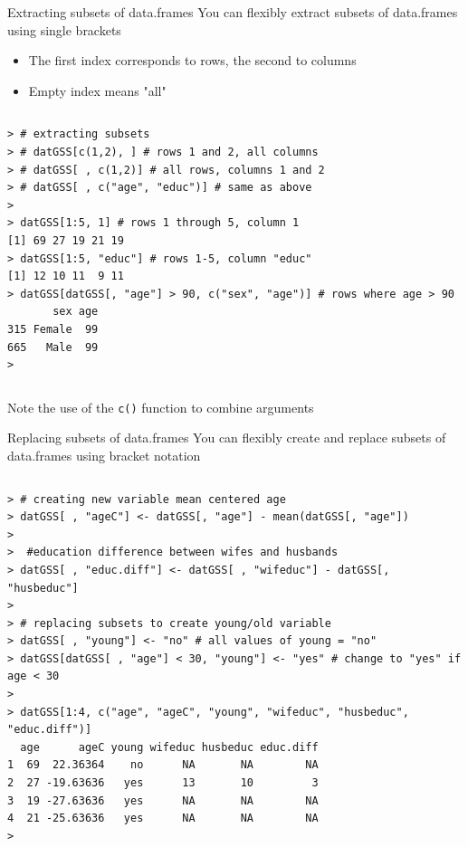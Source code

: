 \documentclass[table,smaller]{beamer}
\begin{document}
\begin{frame}[fragile,label=sec-5-4]{Extracting subsets of data.frames}
 You can flexibly extract subsets of data.frames using single brackets
\begin{itemize}
\item The first index corresponds to rows, the second to columns
\item Empty index means "all"
\end{itemize}

\vspace{-.5em}
\begin{columns}
\begin{block}{}
\begin{verbatim}
> # extracting subsets
> # datGSS[c(1,2), ] # rows 1 and 2, all columns
> # datGSS[ , c(1,2)] # all rows, columns 1 and 2
> # datGSS[ , c("age", "educ")] # same as above
> 
> datGSS[1:5, 1] # rows 1 through 5, column 1
[1] 69 27 19 21 19
> datGSS[1:5, "educ"] # rows 1-5, column "educ"
[1] 12 10 11  9 11
> datGSS[datGSS[, "age"] > 90, c("sex", "age")] # rows where age > 90
       sex age
315 Female  99
665   Male  99
>
\end{verbatim}
\end{block}
\end{columns}
\vspace{.5em}

Note the use of the \verb~c()~ function to combine arguments
\end{frame}
\begin{frame}[fragile,label=sec-5-5]{Replacing subsets of data.frames}
 You can flexibly create and replace subsets of data.frames using bracket notation

\vspace{-.5em}
\begin{columns}
\begin{block}{}
\begin{verbatim}
> # creating new variable mean centered age
> datGSS[ , "ageC"] <- datGSS[, "age"] - mean(datGSS[, "age"])
> 
>  #education difference between wifes and husbands
> datGSS[ , "educ.diff"] <- datGSS[ , "wifeduc"] - datGSS[, "husbeduc"]
> 
> # replacing subsets to create young/old variable
> datGSS[ , "young"] <- "no" # all values of young = "no"
> datGSS[datGSS[ , "age"] < 30, "young"] <- "yes" # change to "yes" if age < 30
> 
> datGSS[1:4, c("age", "ageC", "young", "wifeduc", "husbeduc", "educ.diff")]
  age      ageC young wifeduc husbeduc educ.diff
1  69  22.36364    no      NA       NA        NA
2  27 -19.63636   yes      13       10         3
3  19 -27.63636   yes      NA       NA        NA
4  21 -25.63636   yes      NA       NA        NA
>
\end{verbatim}
\end{block}
\end{columns}
\vspace{.5em}
\end{frame}
\end{document}

